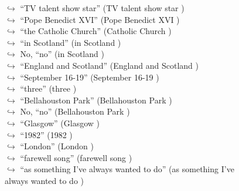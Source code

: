 \documentclass[11pt,a4paper, onecolumn]{article}
\begin{document}
\begin{figure}[t] \small \begin{tcolorbox}[boxsep=0pt,left=5pt,right=0pt,top=2pt,colback = yellow!5] \begin{dialogue}
 \small 
\colorbox{pink!25}{$\hookrightarrow$}
{ ``TV talent show star'' (TV talent show star ) }
\\
\colorbox{pink!25}{$\hookrightarrow$}
{ ``Pope Benedict XVI'' (Pope Benedict XVI ) }
\\
\colorbox{pink!25}{$\hookrightarrow$}
{ ``the Catholic Church'' (Catholic Church ) }
\\
\colorbox{pink!25}{$\hookrightarrow$}
{ ``in Scotland'' (in Scotland ) }
\\
\colorbox{pink!25}{$\hookrightarrow$}
\colorbox{red!25}{No,}
{ ``no'' (in Scotland ) }
\\
\colorbox{pink!25}{$\hookrightarrow$}
{ ``England and Scotland'' (England and Scotland ) }
\\
\colorbox{pink!25}{$\hookrightarrow$}
{ ``September 16-19'' (September 16-19 ) }
\\
\colorbox{pink!25}{$\hookrightarrow$}
{ ``three'' (three ) }
\\
\colorbox{pink!25}{$\hookrightarrow$}
{ ``Bellahouston Park'' (Bellahouston Park ) }
\\
\colorbox{pink!25}{$\hookrightarrow$}
\colorbox{red!25}{No,}
{ ``no'' (Bellahouston Park ) }
\\
\colorbox{pink!25}{$\hookrightarrow$}
{ ``Glasgow'' (Glasgow ) }
\\
\colorbox{pink!25}{$\hookrightarrow$}
{ ``1982'' (1982 ) }
\\
\colorbox{pink!25}{$\hookrightarrow$}
{ ``London'' (London ) }
\\
\colorbox{pink!25}{$\hookrightarrow$}
{ ``farewell song'' (farewell song ) }
\\
\colorbox{pink!25}{$\hookrightarrow$}
{ ``as something I've always wanted to do'' (as something I've always wanted to do ) }
\\
 \end{dialogue}\end{tcolorbox}\end{figure}
\end{document}
